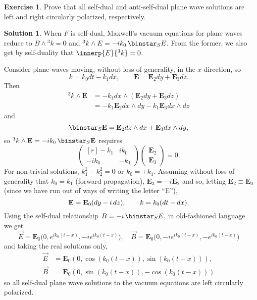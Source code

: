 \documentclass[11pt, a4paper]{report}
\theoremstyle{definition}
\newtheorem{exercise}{Exercise}[part]
\newtheorem{solution}{Solution}[part]
\newenvironment{ex}{\begin{exercise}}{\end{exercise}\pagebreak[1]}
\newenvironment{sol}{\begin{solution}}{\end{solution}\pagebreak[3]}
\renewcommand*{\d}{\ensuremath\mathop{}\mathopen{}d}
\renewcommand*{\star}{\ensuremath\mathop{}\mathopen\binstar\mathord{}}
\begin{document}
\begin{ex}

Prove that all self-dual and anti-self-dual plane wave solutions are left and right circularly polarized, respectively.

\end{ex}

\begin{sol}

When $F$ is self-dual, Maxwell's vacuum equations for plane waves reduce to $B \wedge {}^3 k = 0$ and $^3 k \wedge E = -ik_0 \star_S E$. From the former, we also get by self-duality that $\innerp{E}{^3 k} = 0$.

Consider plane waves moving, without loss of generality, in the $x$-direction, so
\[
    k = k_0 dt - k_1 dx, \qquad
    \mathbf{E} = \mathbf{E}_2 dy + \mathbf{E}_3 dz.
\]
Then
\begin{align*}
    ^3 k \wedge \mathbf{E} &= -k_1 dx \wedge (\mathbf{E}_2 dy + \mathbf{E}_3 dz) \\
        &= -k_1 \mathbf{E}_2 dx \wedge dy - k_1 \mathbf{E}_3 dx \wedge dz
\end{align*}
and
\[
    \star_S \mathbf{E} = \mathbf{E}_2 dz \wedge dx + \mathbf{E}_3 dx \wedge dy,
\]
so $^3 k \wedge \mathbf{E} = -ik_0 \star_S \mathbf{E}$ requires
\[
    \begin{pmatrix*}[r]
        -k_1  & ik_0 \\
        -ik_0 & -k_1
    \end{pmatrix*}
    \begin{pmatrix}
        \mathbf{E}_2 \\ \mathbf{E}_3
    \end{pmatrix}
    = 0.
\]
For non-trivial solutions, $k_1^2 - k_2^2 = 0$ or $k_0 = \pm k_1$. Assuming without loss of generality that $k_0 = k_1$ (forward propagation), $\mathbf{E}_3 = -i \mathbf{E}_2$ and so, letting $\mathbf{E}_2 \equiv \mathbf{E}_0$ (since we have run out of ways of writing the letter ``E''),
\[
    \mathbf{E} = \mathbf{E}_0 (dy -i \d z), \qquad
    k = k_0 (dt - dx).
\]
Using the self-dual relationship $B = -i \star_S E$, in old-fashioned language we get
\[
    \vec{E} = \mathbf{E}_0 \bigl( 0, e^{ik_0 (t - x)}, -ie^{ik_0 (t - x)} \bigr), \quad
    \vec{B} = \mathbf{E}_0 \bigl( 0, -ie^{ik_0 (t - x)}, -e^{ik_0 (t - x)} \bigr)
\]
and taking the real solutions only,
\begin{align*}
    \vec{E} &= \mathbf{E}_0 (0, \cos(k_0 (t - x)), \sin(k_0 (t - x))), \\
    \vec{B} &= \mathbf{E}_0 (0, \sin(k_0 (t - x)), -\cos(k_0 (t - x)))
\end{align*}
so all self-dual plane wave solutions to the vacuum equations are left circularly polarized.


\end{sol}
\end{document}
